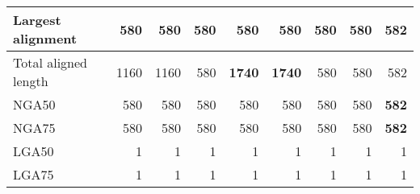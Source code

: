 \documentclass[12pt,a4paper]{article}
\begin{document}
\begin{table}[ht]
\begin{center}
\begin{tabular}{|l*{8}{|r}|}
Largest alignment & 580 & 580 & 580 & 580 & 580 & 580 & 580 & {\bf 582} \\ \hline
Total aligned length & 1160 & 1160 & 580 & {\bf 1740} & {\bf 1740} & 580 & 580 & 582 \\ \hline
NGA50 & 580 & 580 & 580 & 580 & 580 & 580 & 580 & {\bf 582} \\ \hline
NGA75 & 580 & 580 & 580 & 580 & 580 & 580 & 580 & {\bf 582} \\ \hline
LGA50 & 1 & 1 & 1 & 1 & 1 & 1 & 1 & 1 \\ \hline
LGA75 & 1 & 1 & 1 & 1 & 1 & 1 & 1 & 1 \\ \hline
\end{tabular}
\end{center}
\end{table}
\end{document}
